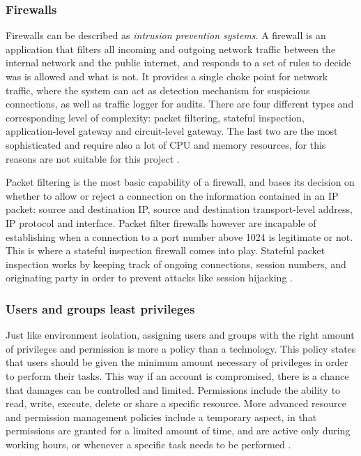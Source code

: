 \subsubsection{Firewalls}
Firewalls can be described as \emph{intrusion prevention systems}. A firewall is
an application that filters all incoming and outgoing network traffic between
the internal network and the public internet, and responds to a set of rules to
decide was is allowed and what is not. It provides a single choke point
for network traffic, where the system can act as detection mechanism for
suspicious connections, as well as traffic logger for audits. There are four
different types and corresponding level of complexity: packet filtering,
stateful inspection, application-level gateway and circuit-level gateway. The
last two are the most sophisticated and require also a lot of CPU and memory
resources, for this reasons are not suitable for this project \cite{WC03}.

Packet filtering is the most basic capability of a firewall, and bases its
decision on whether to allow or reject a connection on the information contained in an IP
packet: source and destination IP, source and destination transport-level
address, IP protocol and interface. Packet filter firewalls however are
incapable of establishing when a connection to a port number above 1024 is
legitimate or not. This is where a stateful inspection firewall comes into play.
Stateful packet inspection works by keeping track of ongoing connections,
session numbers, and originating party in order to prevent attacks like session
hijacking \cite{WS15}.

\subsubsection{Users and groups least privileges}
Just like environment isolation, assigning users and groups with the right
amount of privileges and permission is more a policy than a technology. This
policy states that users should be given the minimum amount necessary of
privileges in order to perform their tasks. This way if an account is
compromised, there is a chance that damages can be controlled and limited.
Permissions include the ability to read, write, execute, delete or share a
specific resource. More advanced resource and permission management policies
include a temporary aspect, in that permissions are granted for a limited amount
of time, and are active only during working hours, or whenever a specific task
needs to be performed \cite{WS15}.

